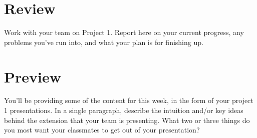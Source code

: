 \documentclass[11pt,letterpaper,boxed]{hmcpset}
\begin{document}
\section*{Review} 
\begin{problem}
Work with your team on Project 1. Report here on your current
progress, any problems you've run into, and what your plan is for
finishing up.
\end{problem}

\begin{solution}
\vspace{12cm}
\end{solution}
\pagebreak

\section*{Preview} 
\begin{problem}
You'll be providing some of the content for this week, in the form of
your project 1 presentations. In a single paragraph, describe the
intuition and/or key ideas behind the extension that your team is
presenting. What two or three things do you most want your classmates to
get out of your presentation? 
\end{problem}
\begin{solution}
\vspace{12cm}
\end{solution}
\end{document}
